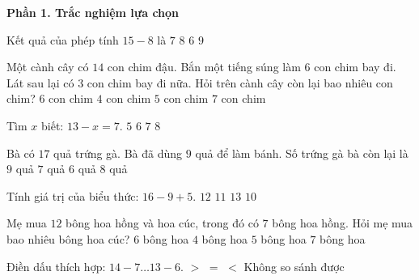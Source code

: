 \textbf{Phần 1. Trắc nghiệm lựa chọn}

\begin{ex} %
Kết quả của phép tính $15 - 8$ là
\choice
{\True $7$}
{$8$}
{$6$}
{$9$}
\end{ex}

\begin{ex} %
Một cành cây có $14$ con chim đậu. Bắn một tiếng súng làm $6$ con chim bay đi. Lát sau lại có $3$ con chim bay đi nữa. Hỏi trên cành cây còn lại bao nhiêu con chim?
\choice
{$6$ con chim}
{$4$ con chim}
{\True $5$ con chim}
{$7$ con chim}
\end{ex}

\begin{ex} %
Tìm $x$ biết: $13 - x = 7$.
\choice
{$5$}
{\True $6$}
{$7$}
{$8$}
\end{ex}

\begin{ex} %
Bà có $17$ quả trứng gà. Bà đã dùng $9$ quả để làm bánh. Số trứng gà bà còn lại là
\choice
{$9$ quả}
{$7$ quả}
{$6$ quả}
{\True $8$ quả}
\end{ex}

\begin{ex} %
Tính giá trị của biểu thức: $16 - 9 + 5$.
\choice
{\True $12$}
{$11$}
{$13$}
{$10$}
\end{ex}

\begin{ex} %
Mẹ mua $12$ bông hoa hồng và hoa cúc, trong đó có $7$ bông hoa hồng. Hỏi mẹ mua bao nhiêu bông hoa cúc?
\choice
{$6$ bông hoa}
{$4$ bông hoa}
{\True $5$ bông hoa}
{$7$ bông hoa}
\end{ex}

\begin{ex} %
Điền dấu thích hợp: $14 - 7 \dots 13 - 6$.
\choice
{$>$}
{\True $=$}
{$<$}
{Không so sánh được}
\end{ex}

